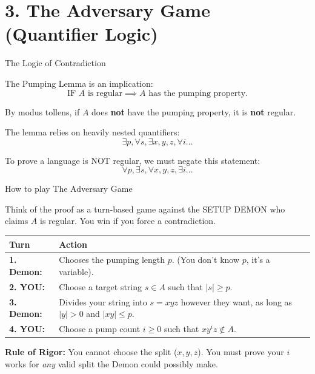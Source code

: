 \documentclass[10pt,aspectratio=169]{beamer}
\begin{document}
\section{3. The Adversary Game (Quantifier Logic)}

\begin{frame}{The Logic of Contradiction}

The Pumping Lemma is an implication: 
\[ \text{IF } A \text{ is regular} \implies A \text{ has the pumping property.} \]

\vspace{0.8em}
By modus tollens, if $A$ does \textbf{not} have the pumping property, it is \textbf{not} regular.

\vspace{0.8em}
The lemma relies on heavily nested quantifiers:
\[ \exists p, \forall s, \exists x,y,z, \forall i \dots \]

To prove a language is NOT regular, we must negate this statement:
\[ \forall p, \exists s, \forall x,y,z, \exists i \dots \]

\end{frame}

\begin{frame}{How to play The Adversary Game}

Think of the proof as a turn-based game against the SETUP DEMON who claims $A$ is regular. You win if you force a contradiction.

\vspace{0.8em}
\begin{table}
\centering
\begin{tabular}{lp{8cm}}
\toprule
\textbf{Turn} & \textbf{Action} \\
\midrule
\textbf{1. Demon:} & Chooses the pumping length $p$. (You don't know $p$, it's a variable). \\
\textbf{2. YOU:} & Choose a target string $s \in A$ such that $|s| \geq p$. \\
\textbf{3. Demon:} & Divides your string into $s = xyz$ however they want, as long as $|y|>0$ and $|xy| \le p$. \\
\textbf{4. YOU:} & Choose a pump count $i \ge 0$ such that $xy^iz \notin A$. \\
\bottomrule
\end{tabular}
\end{table}

\vspace{0.8em}
\textbf{Rule of Rigor:} You cannot choose the split ($x,y,z$). You must prove your $i$ works for \textit{any} valid split the Demon could possibly make.

\end{frame}
\end{document}

